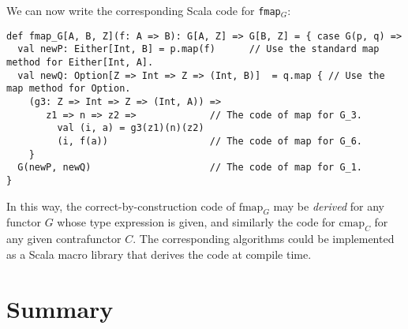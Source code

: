 We can now write the corresponding Scala code for \lstinline!fmap!$_{G}$:
\begin{lstlisting}
def fmap_G[A, B, Z](f: A => B): G[A, Z] => G[B, Z] = { case G(p, q) =>
  val newP: Either[Int, B] = p.map(f)      // Use the standard map method for Either[Int, A].
  val newQ: Option[Z => Int => Z => (Int, B)]  = q.map { // Use the map method for Option.
    (g3: Z => Int => Z => (Int, A)) => 
       z1 => n => z2 =>             // The code of map for G_3.
         val (i, a) = g3(z1)(n)(z2)
         (i, f(a))                  // The code of map for G_6.
    }
  G(newP, newQ)                     // The code of map for G_1.
}
\end{lstlisting}
In this way, the correct-by-construction code of $\text{fmap}_{G}$
may be \emph{derived} for any functor $G$ whose type expression is
given, and similarly the code for $\text{cmap}_{C}$ for any given
contrafunctor $C$. The corresponding algorithms could be implemented
as a Scala macro library that derives the code at compile time.

\section{Summary}

